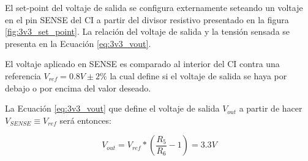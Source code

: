 \documentclass[10pt,a4paper]{article}
\begin{document}
\begin{itemize}
El set-point del voltaje de salida se configura externamente seteando un voltaje
en el pin SENSE del \acrshort{CI} a partir del divisor resistivo presentado en
la figura \ref{fig:3v3_set_point}. La relación del voltaje de salida y la
tensión sensada se presenta en la Ecuación \ref{eq:3v3_vout}.

El voltaje aplicado en SENSE es comparado al interior del \acrshort{CI} contra
una referencia $V_{ref} = 0.8 V \pm2\%$ la cual define si el voltaje de
salida se haya por debajo o por encima del valor deseado. 

La Ecuación \ref{eq:3v3_vout} que define el voltaje de salida $V_{out}$ a partir
de hacer $ V_{SENSE} \equiv V_{ref}$ será entonces:

\begin{equation}
    V_{out} = V_{ref}*(\frac{R_{5}}{R_{6}}-1) = 3.3 V
    \label{eq:3v3_vout}
\end{equation}


\end{itemize}
\end{document}
